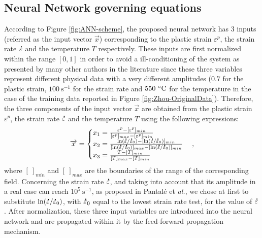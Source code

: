\documentclass[algorithms,article,submit,pdftex,moreauthors]{Definitions/mdpi}
\makeatletter
\DeclareRobustCommand{\mdot}[1]{\accentset{\mbox{\bfseries .}}{#1}}
\DeclareRobustCommand{\eal}{et \emph{al.}\@\xspace}
\DeclareRobustCommand{\ps}{\text{s}^{-1}}
\makeatother
\begin{document}
\subsection{Neural Network governing equations}\label{sec:ANN-equations}

According to Figure \ref{fig:ANN-scheme}, the proposed neural network has $3$ inputs (referred as the input vector $\overrightarrow{x}$) corresponding to the plastic strain $\varepsilon^p$, the strain rate $\mdot\varepsilon$ and the temperature $T$ respectively.
These inputs are first normalized within the range $[0,1]$ in order to avoid a ill-conditioning of the system as presented by many other authors in the literature \cite{Lin-2008, Lu-2011} since these three variables represent different physical data with a very different amplitudes ($0.7$ for the plastic strain, $100~\ps$ for the strain rate and $550~\celsius$ for the temperature in the case of the training data reported in Figure \ref{fig:Zhou-OriginalData}).
Therefore, the three components of the input vector $\overrightarrow{x}$ are obtained from the plastic strain $\varepsilon^p$, the strain rate $\mdot\varepsilon$ and the temperature $T$ using the following expressions:
\begin{equation}
\overrightarrow{x}=
\begin{cases}
x_1 = \frac{\varepsilon^p - [\varepsilon^p]_{min}}{[\varepsilon^p]_{max} - [\varepsilon^p]_{min}}\\
x_2 = \frac{\ln(\mdot\varepsilon/\mdot\varepsilon_0)-[\ln(\mdot\varepsilon/\mdot\varepsilon_0)]_{min}}{[\ln(\mdot\varepsilon/\mdot\varepsilon_0)]_{max}-[\ln(\mdot\varepsilon/\mdot\varepsilon_0)]_{min}}\\
x_3 = \frac{T-[T]_{min}}{[T]_{max}-[T]_{min}}
\end{cases},
\label{eq:CR1}
\end{equation}
where $[~]_{min}$ and $[~]_{max}$  are the boundaries of the range of the corresponding field.
Concerning the strain rate $\mdot\varepsilon$, and taking into account that its amplitude in a real case can reach $10^5~\ps$, as proposed in Pantalé \eal \cite{Pantale-2021}, we chose at first to substitute $\ln(\mdot\varepsilon/\mdot\varepsilon_0)$, with $\mdot\varepsilon_0$ equal to the lowest strain rate test, for the value of $\mdot\varepsilon$.
After normalization, these three input variables are introduced into the neural network and are propagated within it by the feed-forward propagation mechanism.
\end{document}
